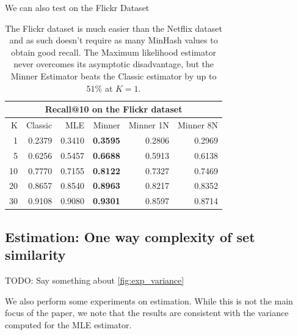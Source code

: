 We can also test on the Flickr Dataset
\begin{table}
\centering
 \begin{tabular}{|r| r r r r r|} 
 \hline
     \multicolumn{6}{|c|}{Recall@10 on the Flickr dataset} \\
 \hline
 K  & Classic & MLE & Minner & Minner 1N & Minner 8N \\
 \hline
    1 & 0.2379 & 0.3410 & \textbf{ 0.3595} & 0.2806 & 0.2969 \\
   5 & 0.6256 & 0.5457 & \textbf{ 0.6688} & 0.5913 & 0.6138 \\
  10 & 0.7770 & 0.7155 & \textbf{ 0.8122} & 0.7327 & 0.7469 \\
  20 & 0.8657 & 0.8540 & \textbf{ 0.8963} & 0.8217 & 0.8352 \\
  30 & 0.9108 & 0.9080 & \textbf{ 0.9301} & 0.8597 & 0.8714 \\
  \hline
 \end{tabular}
 \caption{The Flickr dataset is much easier than the Netflix dataset and as such doesn't require as many MinHash values to obtain good recall. The Maximum likelihood estimator never overcomes its asymptotic disadvantage, but the Minner Estimator beats the Classic estimator by up to $51\%$ at $K=1$.}
 \label{tab:flickr}
\end{table}

\subsection{Estimation: One way complexity of set similarity}
\label{sec:estimation}

TODO: Say something about \cref{fig:exp_variance}

We also perform some experiments on estimation.
While this is not the main focus of the paper, we note that the results are consistent with the variance computed for the MLE estimator.

